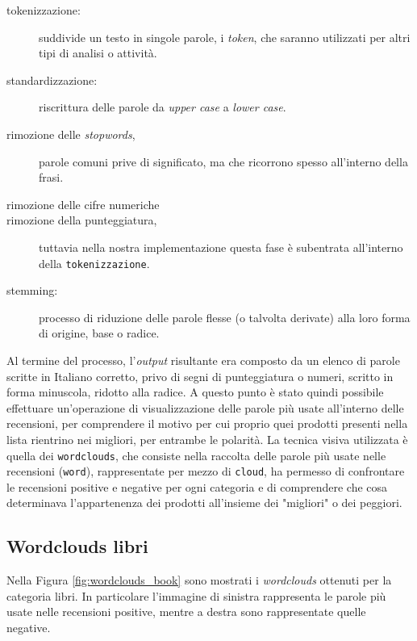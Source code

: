 \begin{description}
			\begin{description}
				\item[tokenizzazione:] suddivide un testo in singole parole, i \textit{token}, che saranno utilizzati per altri tipi di analisi o attività.
				\item[standardizzazione:] riscrittura delle parole da \textit{upper case} a \textit{lower case}. 
				\item[rimozione delle \textit{stopwords},] parole comuni prive di significato, ma che ricorrono spesso all'interno della frasi.
				\item[rimozione delle cifre numeriche]
				\item[rimozione della punteggiatura,] tuttavia nella nostra implementazione questa fase è subentrata all'interno della \verb|tokenizzazione|. 
				\item [stemming:] processo di riduzione delle parole flesse (o talvolta derivate) alla loro forma di origine, base o radice.
			\end{description}
			
			Al termine del processo, l'\textit{output} risultante era composto da un elenco di parole scritte in Italiano corretto, privo di segni di punteggiatura o numeri, scritto in forma minuscola, ridotto alla radice. A questo punto è stato quindi possibile effettuare un'operazione di visualizzazione delle parole più usate all'interno delle recensioni, per comprendere il motivo per cui proprio quei prodotti presenti nella lista rientrino nei migliori, per entrambe le polarità. La tecnica visiva utilizzata è quella dei \verb|wordclouds|, che consiste nella raccolta delle parole più usate nelle recensioni (\verb|word|), rappresentate per mezzo di \verb|cloud|, ha permesso di confrontare le recensioni positive e negative per ogni categoria e di comprendere che cosa determinava l'appartenenza dei prodotti all'insieme dei "migliori" o dei peggiori. 
			\end{description}

	
			\subsection{Wordclouds libri} 
				Nella Figura \ref{fig:wordclouds_book} sono mostrati i \textit{wordclouds} ottenuti per la categoria libri. In particolare l'immagine di sinistra rappresenta le parole più usate nelle recensioni positive, mentre a destra sono rappresentate quelle negative. 
				
